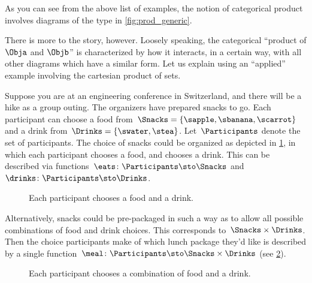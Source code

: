 As you can see from the above list of examples, the notion of categorical product involves diagrams of the type in \cref{fig:prod_generic}. 

  \begin{marginfigure}
  \begin{center}
  \end{center}
  \caption{}
    \label{fig:prod_generic}
  \end{marginfigure}
There is more to the story, however. Loosely speaking, the categorical ``product of $\Obja$ and $\Objb$'' is characterized by how it interacts, in a certain way, with all other diagrams which have a similar form. Let us explain using an ``applied'' example involving the cartesian product of sets. 

Suppose you are at an engineering conference in Switzerland, and there will be a hike as a group outing.
The organizers have prepared snacks to go.
Each participant can choose a food from~$\Snacks=\{\sapple,\sbanana,\scarrot\}$ and a drink from~$\Drinks=\{\swater,\stea\}$.
Let~$\Participants$ denote the set of participants. 
The choice of snacks could be organized as depicted in \cref{fig:snacks_1}, in which each participant chooses a food, and chooses a drink.
This can be described via functions~$\eats \colon \Participants \sto \Snacks$ and~$\drinks \colon  \Participants \sto \Drinks$.

\begin{figure}[h!]
  \begin{center}
  \end{center}
  \caption{Each participant chooses a food and a drink.}
  \label{fig:snacks_1}
\end{figure}

Alternatively, snacks could be pre-packaged in such a way as to allow all possible combinations of food and drink choices. This corresponds to~$\Snacks\times \Drinks$.
Then the choice participants make of which lunch package they'd like is described by a single function~$\meal \colon \Participants\sto \Snacks\times \Drinks$ (see \cref{fig:snacks_2}).

\begin{figure}[h!]
  \begin{center}
  \end{center}
  \caption{Each participant chooses a combination of food and a drink. \label{fig:snacks_2}}
\end{figure}


